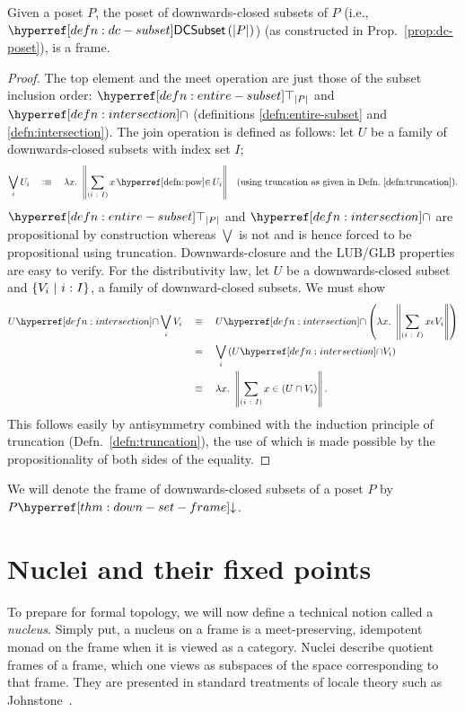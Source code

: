 \begin{thm}\label{thm:down-set-frame}
  Given a poset $P$, the poset of downwards-closed subsets of $P$ (i.e.,
  $\dcsubset{\abs{P}}$) (as constructed in Prop.~\ref{prop:dc-poset}), is a frame.
\end{thm}
\begin{proof}
  The top element and the meet operation are just those of the subset inclusion order:
  $\entire{\abs{P}}$ and $\intersectnm{}$ (definitions \ref{defn:entire-subset} and
  \ref{defn:intersection}). The join operation is defined as follows: let $U$ be a family
  of downwards-closed subsets with index set $I$;
  \begin{align*}
    \bigvee_i U_i \quad\is\quad \lambda x.~ \trunc{\sigmaty{i}{I}{\mempow{x}{U_i}}}
      && \text{(using truncation as given in Defn.~\ref{defn:truncation})}.
  \end{align*}
  $\entire{\abs{P}}$ and $\intersectnm{}$ are propositional by construction whereas $\bigvee$ is
  not and is hence forced to be propositional using truncation. Downwards-closure and the
  LUB/GLB properties are easy to verify. For the distributivity law, let $U$ be a
  downwards-closed subset and $\left\{  V_i ~|~ i\hspace{0.1mm}:\hspace{0.1mm}I  \right\}$, a family of
  downward-closed subsets. We must show
  \begin{align*}
    \intersect{U}{\bigvee_i V_i}
      \quad&\equiv\quad \intersect{U}{\left(\lambda x.~ \trunc{\sigmaty{i}{I}{x \epsilon V_i}}\right)}\\
      \quad&=\quad \bigvee_i \left(\intersect{U}{V_i} \right)\\
      \quad&\equiv\quad \lambda x.~ \trunc{\sigmaty{i}{I}{x \in (U \cap V_i)}}.
  \end{align*}
  This follows easily by antisymmetry combined with the induction principle of truncation
  (Defn.~\ref{defn:truncation}), the use of which is made possible by the propositionality
  of both sides of the equality.
\end{proof}

We will denote the frame of downwards-closed subsets of a poset $P$ by $\dcframe{P}$.

\section{Nuclei and their fixed points}\label{sec:nuclei}

To prepare for formal topology, we will now define a technical notion called a
\emph{nucleus}. Simply put, a nucleus on a frame is a meet-preserving, idempotent monad on
the frame when it is viewed as a category. Nuclei describe quotient frames of a frame,
which one views as subspaces of the space corresponding to that frame. They are presented
in standard treatments of locale theory such as Johnstone~\cite[Sec.~II.2]{stone-spaces}.

